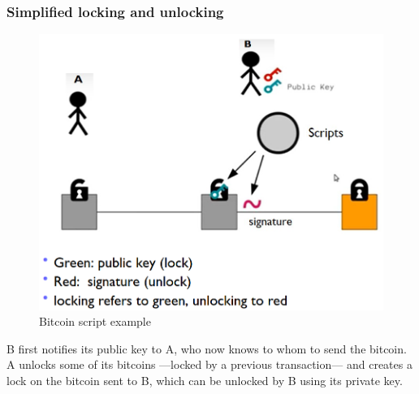 \subsubsection{Simplified locking and unlocking}
\begin{figure}[htbp]
   \centering
   \includegraphics{images/bitcoin_script.png}
   \caption{Bitcoin script example}
   \label{fig:bitcoin_script}
\end{figure}
B first notifies its public key to A, who now knows to whom to send the bitcoin.
A unlocks some of its bitcoins ---locked by a previous transaction--- and creates a lock on the bitcoin sent to B, which can be unlocked by B using its private key.

